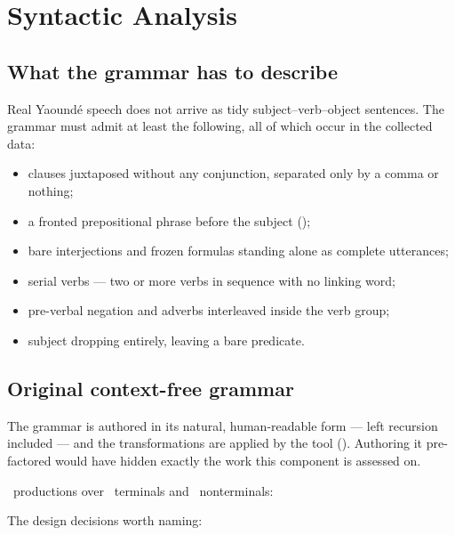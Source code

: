 \section{Syntactic Analysis}\label{sec:syntax}

\subsection{What the grammar has to describe}

Real Yaound\'e speech does not arrive as tidy subject--verb--object sentences. The grammar
must admit at least the following, all of which occur in the collected data:

\begin{itemize}[leftmargin=1.4em, itemsep=0.15em]
  \item clauses juxtaposed without any conjunction, separated only by a comma or nothing;
  \item a fronted prepositional phrase before the subject ();
  \item bare interjections and frozen formulas standing alone as complete utterances;
  \item serial verbs --- two or more verbs in sequence with no linking word;
  \item pre-verbal negation and adverbs interleaved inside the verb group;
  \item subject dropping entirely, leaving a bare predicate.
\end{itemize}

\subsection{Original context-free grammar}

The grammar is authored in its natural, human-readable form --- left recursion included ---
and the transformations are applied by the tool (). Authoring it pre-factored
would have hidden exactly the work this component is assessed on.

\ProductionCount\ productions over \TerminalCount\ terminals and \NonterminalCount\
nonterminals:



The design decisions worth naming:

